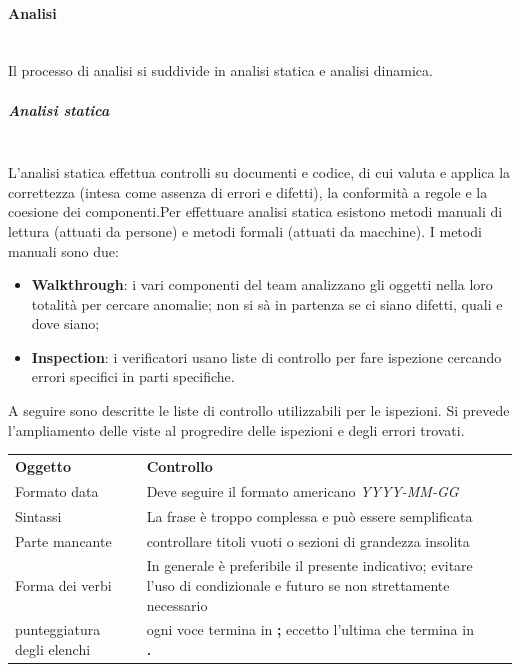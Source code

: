		\paragraph{Analisi} \mbox{}\\
		Il processo di analisi si suddivide in analisi statica e analisi dinamica.
			\subparagraph{Analisi statica} \mbox{}\\
			L'analisi statica effettua controlli su documenti e codice, di cui valuta e applica la correttezza (intesa come assenza di errori e difetti), la conformità a regole e la coesione dei componenti.\newline Per effettuare analisi statica esistono metodi manuali di lettura (attuati da persone) e metodi formali (attuati da macchine). I metodi manuali sono due:
			\begin{itemize}
				\item \textbf{Walkthrough}: i vari componenti del team analizzano gli oggetti nella loro totalità per cercare anomalie; non si sà in partenza se ci siano difetti, quali e dove siano;
				\item \textbf{Inspection}: i verificatori usano liste di controllo per fare ispezione cercando errori specifici in parti specifiche.
			\end{itemize}
			A seguire sono descritte le liste di controllo utilizzabili per le ispezioni. Si prevede l'ampliamento delle viste al progredire delle ispezioni e degli errori trovati.
			
			\begin{center}
				\begin{longtable}{ >{\centering}p{} >{\centering}p{}						>{\raggedright}p{} >{\centering}p{}}				
					\rowcolorhead 
					\textbf{\color{white}Oggetto} 
					& \textbf{\color{white}Controllo} 					
					\tabularnewline
					Formato data & Deve seguire il formato americano \textit{YYYY-MM-GG}
					\tabularnewline
					Sintassi & La frase è troppo complessa e può essere semplificata 
					\tabularnewline
					Parte mancante & controllare titoli vuoti o sezioni di grandezza insolita
						\tabularnewline
						Forma dei verbi & In generale è preferibile il presente indicativo; evitare l'uso di condizionale e futuro se non strettamente necessario
						\tabularnewline
						punteggiatura degli elenchi & ogni voce termina in \textbf{;} eccetto l'ultima che termina in \textbf{.}
				\end{longtable}
			\end{center}
			
